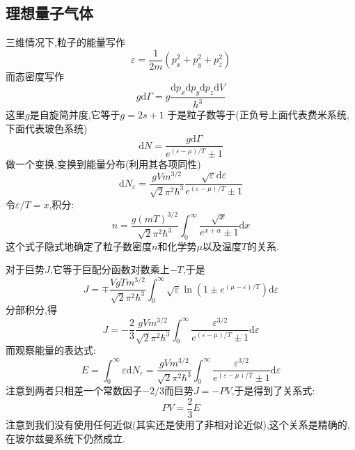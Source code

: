 \subsection{理想量子气体}
    三维情况下,粒子的能量写作
    \[\varepsilon=\frac{1}{2m}(p_x^{2}+p_y^{2}+p_z^{2})\]
    而态密度写作
    \[g \mathrm{d} \Gamma=g\dfrac{\mathrm{d} p_x \mathrm{d}  p_y \mathrm{d} p_z \mathrm{d} V}{h^{3}}\]
    这里$g$是自旋简并度,它等于$g=2s+1$
    于是粒子数等于(正负号上面代表费米系统,下面代表玻色系统)
    \[\mathrm{d} N=\dfrac{g\mathrm{d} \Gamma}{e^{(\varepsilon-\mu)/ T}\pm 1}\]
    做一个变换,变换到能量分布(利用其各项同性)
    \begin{equation}
      \mathrm{d} N_\varepsilon=\dfrac{g V m^{3 / 2}}{\sqrt{2} \pi ^{2} \hbar ^{3}}\dfrac{\sqrt{\varepsilon}\mathrm{d} \varepsilon}{e^{(\varepsilon-\mu) / T}\pm 1}
    \end{equation}
    令$\varepsilon / T=x$,积分:
    \begin{equation}
      n=\dfrac{g(mT)^{3 / 2}}{\sqrt{2} \pi^{2}\hbar^{3}}\int_{0}^{\infty} \dfrac{\sqrt{x}}{e^{x+\alpha}\pm 1} \mathrm{d}x
    \end{equation}
    这个式子隐式地确定了粒子数密度$n$和化学势$\mu$以及温度$T$的关系.

    对于巨势$J$,它等于巨配分函数对数乘上$-T$,于是
    \[
      J=\mp \dfrac{V g T m^{3 / 2}}{\sqrt{2} \pi^{2}\hbar^{3}}\int_{0}^{\infty} \sqrt{\varepsilon} \ln(1\pm  e^{(\mu-\varepsilon) / T}) \mathrm{d}\varepsilon
    \]
    分部积分,得 
    \begin{equation}
      J=-\dfrac{2}{3}\dfrac{gVm^{3 / 2}}{\sqrt{2}\pi^{2}\hbar^{3}}\int_{0}^{\infty} \dfrac{\varepsilon^{3 / 2}}{e^{(\varepsilon-\mu) / T}\pm 1} \mathrm{d}\varepsilon
      \label{eq:4.22}
    \end{equation}
    而观察能量的表达式:
    \begin{equation}
      E=\int_{0}^{\infty} \varepsilon \mathrm{d} N_\varepsilon=\dfrac{gVm^{3 / 2}}{\sqrt{2} \pi^{2}\hbar^{3}}\int_{0}^{\infty} \dfrac{\varepsilon^{3 / 2}}{e^{(\varepsilon-\mu)/T}\pm 1} \mathrm{d}\varepsilon
    \end{equation}
    注意到两者只相差一个常数因子$- 2 / 3$而巨势$J=-PV$,于是得到了关系式:
    \begin{equation}
      PV=\frac{2}{3}E 
    \end{equation}
    注意到我们没有使用任何近似(其实还是使用了非相对论近似),这个关系是精确的,在玻尔兹曼系统下仍然成立.

